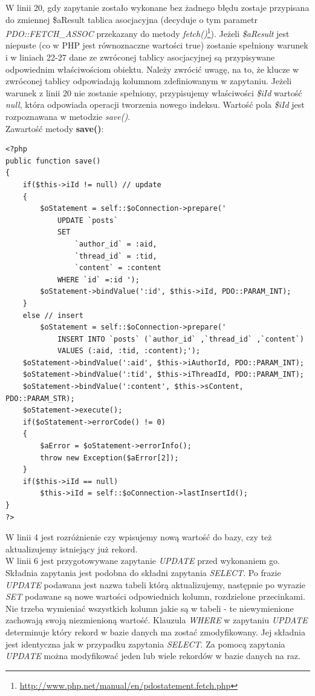 \documentclass[a4paper,10pt]{article}
\begin{document}
W linii 20, gdy zapytanie zostało wykonane bez żadnego błędu zostaje przypisana do zmiennej \$aResult tablica asocjacyjna (decyduje o tym parametr \textit{PDO::FETCH\_ASSOC} przekazany do metody \textit{fetch()}\footnote{\href{http://www.php.net/manual/en/pdostatement.fetch.php}{http://www.php.net/manual/en/pdostatement.fetch.php}}). Jeżeli \textit{\$aResult} jest niepuste (co w PHP jest równoznaczne wartości true) zostanie spełniony warunek i w liniach 22-27 dane ze zwróconej tablicy asocjacyjnej są przypisywane odpowiednim właściwościom obiektu. Należy zwrócić uwagę, na to, że klucze w zwróconej tablicy odpowiadają kolumnom zdefiniowanym w zapytaniu. Jeżeli warunek z linii 20 nie zostanie spełniony, przypisujemy właściwości \textit{\$iId} wartość \textit{null}, która odpowiada operacji tworzenia nowego indeksu. Wartość pola \textit{\$iId} jest rozpoznawana w metodzie \textit{save()}. \\
Zawartość metody \textbf{save()}: \\
\begin{verbatim}
<?php
public function save()
{
	if($this->iId != null) // update
	{
		$oStatement = self::$oConnection->prepare('
			UPDATE `posts` 
			SET
				`author_id` = :aid,
				`thread_id` = :tid,
				`content` = :content 
			WHERE `id` =:id ');
		$oStatement->bindValue(':id', $this->iId, PDO::PARAM_INT);
	}
	else // insert
		$oStatement = self::$oConnection->prepare('
			INSERT INTO `posts` (`author_id` ,`thread_id` ,`content`) 
			VALUES (:aid, :tid, :content);');
	$oStatement->bindValue(':aid', $this->iAuthorId, PDO::PARAM_INT);
	$oStatement->bindValue(':tid', $this->iThreadId, PDO::PARAM_INT);
	$oStatement->bindValue(':content', $this->sContent, PDO::PARAM_STR);
	$oStatement->execute();
	if($oStatement->errorCode() != 0)
	{
		$aError = $oStatement->errorInfo();
		throw new Exception($aError[2]);
	}
	if($this->iId == null) 
		$this->iId = self::$oConnection->lastInsertId();
}
?>
\end{verbatim}
W linii 4 jest rozróżnienie czy wpisujemy nową wartość do bazy, czy też aktualizujemy istniejący już rekord.\\
W linii 6 jest przygotowywane zapytanie \textit{UPDATE} przed wykonaniem go. Składnia zapytania jest podobna do składni zapytania \textit{SELECT}. Po frazie \textit{UPDATE} podawana jest nazwa tabeli którą aktualizujemy, następnie po wyrazie \textit{SET} podawane są nowe wartości odpowiednich kolumn, rozdzielone przecinkami. Nie trzeba wymieniać wszystkich kolumn jakie są w tabeli - te niewymienione zachowają swoją niezmienioną wartość. Klauzula \textit{WHERE} w zapytaniu \textit{UPDATE} determinuje który rekord w bazie danych ma zostać zmodyfikowany. Jej składnia jest identyczna jak w przypadku zapytania \textit{SELECT}. Za pomocą zapytania \textit{UPDATE} można modyfikować jeden lub wiele rekordów w bazie danych na raz.\\
\end{document}
